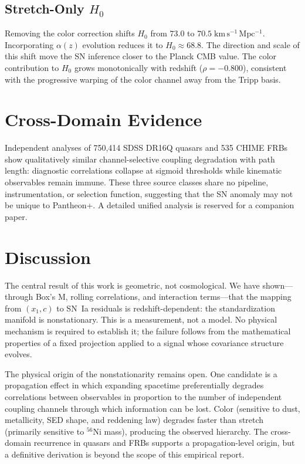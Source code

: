 \documentclass[twocolumn,showpacs,preprintnumbers,amsmath,amssymb,prl]{revtex4-2}
\begin{document}
\subsection{Stretch-Only $H_0$}

Removing the color correction shifts $H_0$ from $73.0$ to $70.5\;\mathrm{km\,s^{-1}\,Mpc^{-1}}$. Incorporating $\alpha(z)$ evolution reduces it to $H_0 \approx 68.8$. The direction and scale of this shift move the SN inference closer to the Planck CMB value. The color contribution to $H_0$ grows monotonically with redshift ($\rho = -0.800$), consistent with the progressive warping of the color channel away from the Tripp basis.

\section{Cross-Domain Evidence}
\label{sec:crossdomain}

Independent analyses of 750{,}414 SDSS DR16Q quasars \citep{Lyke2020} and 535 CHIME FRBs \citep{CHIME2021} show qualitatively similar channel-selective coupling degradation with path length: diagnostic correlations collapse at sigmoid thresholds while kinematic observables remain immune. These three source classes share no pipeline, instrumentation, or selection function, suggesting that the SN anomaly may not be unique to Pantheon+. A detailed unified analysis is reserved for a companion paper.

\section{Discussion}
\label{sec:discussion}

The central result of this work is geometric, not cosmological. We have shown---through Box's M, rolling correlations, and interaction terms---that the mapping from $(x_1, c)$ to SN~Ia residuals is redshift-dependent: the standardization manifold is nonstationary. This is a measurement, not a model. No physical mechanism is required to establish it; the failure follows from the mathematical properties of a fixed projection applied to a signal whose covariance structure evolves.

The physical origin of the nonstationarity remains open. One candidate is a propagation effect in which expanding spacetime preferentially degrades correlations between observables in proportion to the number of independent coupling channels through which information can be lost. Color (sensitive to dust, metallicity, SED shape, and reddening law) degrades faster than stretch (primarily sensitive to $^{56}$Ni mass), producing the observed hierarchy. The cross-domain recurrence in quasars and FRBs supports a propagation-level origin, but a definitive derivation is beyond the scope of this empirical report.
\end{document}
